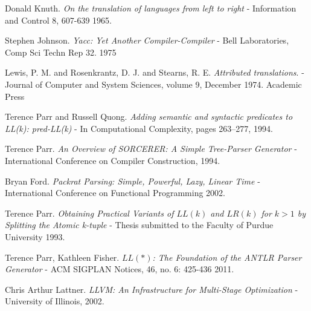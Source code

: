 \begin{thebibliography}{9}

   

	Donald Knuth.
	\emph{On the translation of languages from left to right}
	- Information and Control 8, 607-639
	1965.

	Stephen Johnson.
	\emph{Yacc: Yet Another Compiler-Compiler}
	- Bell Laboratories, Comp Sci Techn Rep 32. 
	1975

	Lewis, P. M. and Rosenkrantz, D. J. and Stearns, R. E.
	\emph{Attributed translations}.
	- Journal of Computer and System Sciences, 
	volume 9,
	December 1974.
	Academic Press

	Terence Parr and Russell Quong.
	\emph{Adding semantic and syntactic predicates to LL(k): pred-LL(k)}
	- In Computational Complexity, pages 263–277,
	1994.


	Terence Parr.
	\emph{An Overview of SORCERER: A Simple Tree-Parser Generator}
	- International Conference on Compiler Construction,
	1994.

	Bryan Ford.
	\emph{Packrat Parsing: Simple, Powerful, Lazy, Linear Time}
	-  International Conference on Functional Programming
	2002.

	Terence Parr.
	\emph{Obtaining Practical Variants of $LL(k)$ and $LR(k)$ for $k>1$ by Splitting the Atomic k-tuple}
	- Thesis submitted to the Faculty of Purdue University
	1993.

	Terence Parr, Kathleen Fisher.
	\emph{$LL(*)$: The Foundation of the ANTLR Parser Generator}
	- ACM SIGPLAN Notices, 46, no. 6: 425-436
	2011.

%

	Chris Arthur Lattner.
	\emph{LLVM: An Infrastructure for Multi-Stage Optimization}
	- University of Illinois, 2002.
	

\end{thebibliography}
